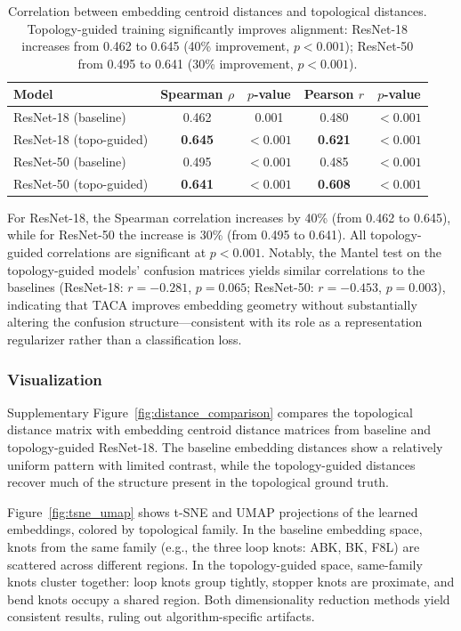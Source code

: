 \documentclass[preprint,review,12pt]{elsarticle}
\begin{document}
\begin{table}[t]
\centering
\caption{Correlation between embedding centroid distances and topological distances. Topology-guided training significantly improves alignment: ResNet-18 increases from 0.462 to 0.645 (40\% improvement, $p < 0.001$); ResNet-50 from 0.495 to 0.641 (30\% improvement, $p < 0.001$).}
\label{tab:embed_align}
\small
\begin{tabular}{@{}lcccc@{}}
\toprule
Model & Spearman $\rho$ & $p$-value & Pearson $r$ & $p$-value \\
\midrule
ResNet-18 (baseline) & 0.462 & 0.001 & 0.480 & $<0.001$ \\
ResNet-18 (topo-guided) & \textbf{0.645} & $<0.001$ & \textbf{0.621} & $<0.001$ \\
\addlinespace
ResNet-50 (baseline) & 0.495 & $<0.001$ & 0.485 & $<0.001$ \\
ResNet-50 (topo-guided) & \textbf{0.641} & $<0.001$ & \textbf{0.608} & $<0.001$ \\
\bottomrule
\end{tabular}
\end{table}

For ResNet-18, the Spearman correlation increases by 40\% (from 0.462 to 0.645), while for ResNet-50 the increase is 30\% (from 0.495 to 0.641). All topology-guided correlations are significant at $p < 0.001$. Notably, the Mantel test on the topology-guided models' confusion matrices yields similar correlations to the baselines (ResNet-18: $r = -0.281$, $p = 0.065$; ResNet-50: $r = -0.453$, $p = 0.003$), indicating that TACA improves embedding geometry without substantially altering the confusion structure---consistent with its role as a representation regularizer rather than a classification loss.

\subsubsection{Visualization}

Supplementary Figure~\ref{fig:distance_comparison} compares the topological distance matrix with embedding centroid distance matrices from baseline and topology-guided ResNet-18. The baseline embedding distances show a relatively uniform pattern with limited contrast, while the topology-guided distances recover much of the structure present in the topological ground truth.


Figure~\ref{fig:tsne_umap} shows t-SNE \citep{vandermaaten2008tsne} and UMAP \citep{mcinnes2018umap} projections of the learned embeddings, colored by topological family. In the baseline embedding space, knots from the same family (e.g., the three loop knots: ABK, BK, F8L) are scattered across different regions. In the topology-guided space, same-family knots cluster together: loop knots group tightly, stopper knots are proximate, and bend knots occupy a shared region. Both dimensionality reduction methods yield consistent results, ruling out algorithm-specific artifacts.
\end{document}

